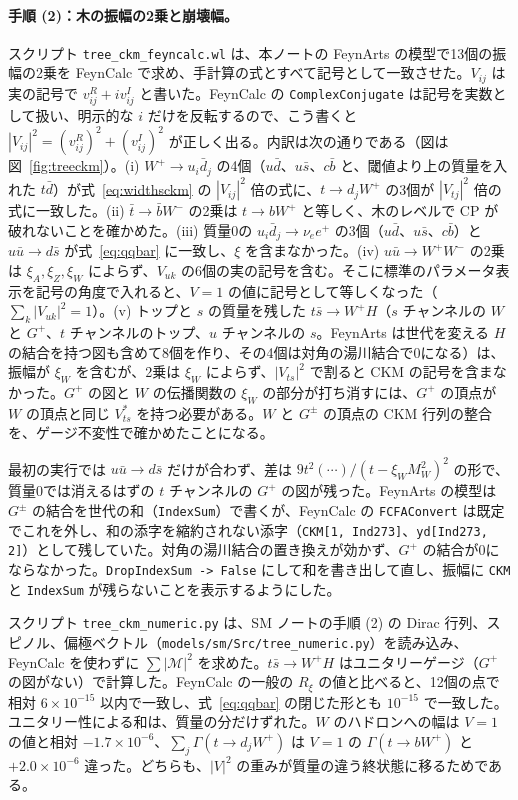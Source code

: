 \documentclass[a4paper,10pt]{ltjsarticle}
\begin{document}
\paragraph{手順 (2)：木の振幅の2乗と崩壊幅。}スクリプト \texttt{tree\_ckm\_feyncalc.wl} は、本ノートの FeynArts の模型で13個の振幅の2乗を FeynCalc で求め、手計算の式とすべて記号として一致させた。$V_{ij}$ は実の記号で $v^R_{ij}+iv^I_{ij}$ と書いた。FeynCalc の \texttt{ComplexConjugate} は記号を実数として扱い、明示的な $i$ だけを反転するので、こう書くと $|V_{ij}|^2=(v^R_{ij})^2+(v^I_{ij})^2$ が正しく出る。内訳は次の通りである（図は図~\ref{fig:treeckm}）。(i) $W^+\to u_i\bar d_j$ の4個（$u\bar d$、$u\bar s$、$c\bar b$ と、閾値より上の質量を入れた $t\bar d$）が式~\eqref{eq:widthsckm} の $|V_{ij}|^2$ 倍の式に、$t\to d_jW^+$ の3個が $|V_{tj}|^2$ 倍の式に一致した。(ii) $\bar t\to\bar bW^-$ の2乗は $t\to bW^+$ と等しく、木のレベルで CP が破れないことを確かめた。(iii) 質量0の $u_i\bar d_j\to\nu_ee^+$ の3個（$u\bar d$、$u\bar s$、$c\bar b$）と $u\bar u\to d\bar s$ が式~\eqref{eq:qqbar} に一致し、$\xi$ を含まなかった。(iv) $u\bar u\to W^+W^-$ の2乗は $\xi_A,\xi_Z,\xi_W$ によらず、$V_{uk}$ の6個の実の記号を含む。そこに標準のパラメータ表示を記号の角度で入れると、$V=1$ の値に記号として等しくなった（$\sum_k|V_{uk}|^2=1$）。(v) トップと $s$ の質量を残した $t\bar s\to W^+H$（$s$ チャンネルの $W$ と $G^+$、$t$ チャンネルのトップ、$u$ チャンネルの $s$。FeynArts は世代を変える $H$ の結合を持つ図も含めて8個を作り、その4個は対角の湯川結合で0になる）は、振幅が $\xi_W$ を含むが、2乗は $\xi_W$ によらず、$|V_{ts}|^2$ で割ると CKM の記号を含まなかった。$G^+$ の図と $W$ の伝播関数の $\xi_W$ の部分が打ち消すには、$G^+$ の頂点が $W$ の頂点と同じ $V_{ts}^*$ を持つ必要がある。$W$ と $G^\pm$ の頂点の CKM 行列の整合を、ゲージ不変性で確かめたことになる。

最初の実行では $u\bar u\to d\bar s$ だけが合わず、差は $9t^2(\cdots)/(t-\xi_WM_W^2)^2$ の形で、質量0では消えるはずの $t$ チャンネルの $G^+$ の図が残った。FeynArts の模型は $G^\pm$ の結合を世代の和（\texttt{IndexSum}）で書くが、FeynCalc の \texttt{FCFAConvert} は既定でこれを外し、和の添字を縮約されない添字（\texttt{CKM[1, Ind273]}、\texttt{yd[Ind273, 2]}）として残していた。対角の湯川結合の置き換えが効かず、$G^+$ の結合が0にならなかった。\texttt{DropIndexSum -> False} にして和を書き出して直し、振幅に \texttt{CKM} と \texttt{IndexSum} が残らないことを表示するようにした。

スクリプト \texttt{tree\_ckm\_numeric.py} は、SM ノートの手順 (2) の Dirac 行列、スピノル、偏極ベクトル（\texttt{models/sm/Src/tree\_numeric.py}）を読み込み、FeynCalc を使わずに $\sum|\mathcal M|^2$ を求めた。$t\bar s\to W^+H$ はユニタリーゲージ（$G^+$ の図がない）で計算した。FeynCalc の一般の $R_\xi$ の値と比べると、12個の点で相対 $6\times10^{-15}$ 以内で一致し、式~\eqref{eq:qqbar} の閉じた形とも $10^{-15}$ で一致した。ユニタリー性による和は、質量の分だけずれた。$W$ のハドロンへの幅は $V=1$ の値と相対 $-1.7\times10^{-6}$、$\sum_j\Gamma(t\to d_jW^+)$ は $V=1$ の $\Gamma(t\to bW^+)$ と $+2.0\times10^{-6}$ 違った。どちらも、$|V|^2$ の重みが質量の違う終状態に移るためである。
\end{document}
